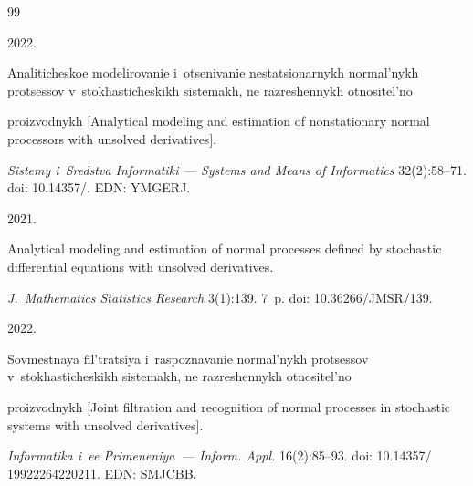 


\renewcommand{\bibname}{\protect\rmfamily References}




{\small\frenchspacing

{ %


\begin{thebibliography}{99}



\vspace*{-4pt}




 2022. 

Analiticheskoe modelirovanie i~otsenivanie nestatsionarnykh normal'nykh protsessov v~stokhasticheskikh sistemakh, ne razreshennykh otnositel'no

 proizvodnykh [Analytical modeling and estimation of nonstationary normal processors with unsolved derivatives].

  \textit{Sistemy i~Sredstva Informatiki --- Systems and Means of Informatics} 32(2):58--71. doi: 10.14357\!/. EDN: YMGERJ.





 2021. 

Analytical modeling and estimation of normal processes defined by stochastic differential equations with unsolved derivatives.

 \textit{J.~Mathematics Statistics Research} 3(1):139. 7~p. doi: 10.36266\!/\!JMSR/139.





 2022.

Sovmestnaya fil'tratsiya i~raspoznavanie normal'nykh pro\-tses\-sov v~stokhasticheskikh sistemakh, ne razreshennykh otnositel'no 

pro\-iz\-vod\-nykh [Joint filtration and recognition of normal processes in stochastic systems with unsolved derivatives]. 

\textit{Informatika i~ee Primeneniya~--- Inform. Appl.} 16(2):85--93. doi: 10.14357\!/ 19922264220211. EDN: SMJCBB.




\end{thebibliography}}}
